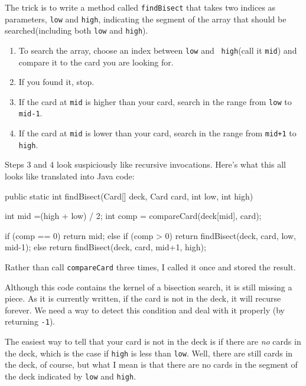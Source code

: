 \documentclass{book}
\begin{document}

The trick is to write a method called {\tt findBisect} that takes
two indices as parameters, {\tt low} and {\tt high}, indicating the
segment of the array that should be searched(including both
{\tt low} and {\tt high}).

\begin{enumerate}

\item To search the array, choose an index between {\tt low} and {\tt
high}(call it {\tt mid}) and compare it to the card you are looking
for.

\item If you found it, stop.

\item If the card at {\tt mid} is higher than your card, search
in the range from {\tt low} to {\tt mid-1}.

\item If the card at {\tt mid} is lower than your card, search
in the range from {\tt mid+1} to {\tt high}.

\end{enumerate}

Steps 3 and 4 look suspiciously like recursive invocations.  Here's
what this all looks like translated into Java code:

\begin{verbatimtab}
public static int findBisect(Card[] deck, Card card, int low, int high) {
    int mid =(high + low) / 2;
    int comp = compareCard(deck[mid], card);

    if (comp == 0) {
        return mid;
    } else if (comp > 0) {
        return findBisect(deck, card, low, mid-1);
    } else {
        return findBisect(deck, card, mid+1, high);
    }
}
\end{verbatimtab}

Rather than call {\tt compareCard} three times, I called it once
and stored the result.

Although this code contains the kernel of a bisection search, it
is still missing a piece.  As it is currently written,
if the card is not in the deck, it will recurse forever.  We
need a way to detect this condition and deal with it properly
(by returning {\tt -1}).


The easiest way to tell that your card is not in the deck
is if there are {\em no} cards in the deck, which is the
case if {\tt high} is less than {\tt low}.  Well, there are
still cards in the deck, of course, but what I mean is that
there are no cards in the segment of the deck indicated by
{\tt low} and {\tt high}.
\end{document}
